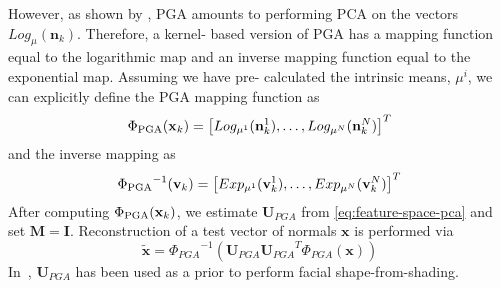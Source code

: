 However, as shown by \citet{smith2008facial}, PGA amounts to
performing PCA on the vectors $Log_\mu(\mathbf{n}_k)$. Therefore, a kernel-
based version of PGA has a mapping function equal to the logarithmic map and an
inverse mapping function equal to the exponential map. Assuming we have pre-
calculated the intrinsic means, $\mu^i$, we can explicitly define the PGA
mapping function as
\begin{equation}\label{eq:pga-kernel}
    \Phi_{\operatorname{PGA}} (\boldsymbol{\mathbf{x}}_k) = \left[ Log_{\mu^1}(\mathbf{n}_k^1), \ldots, Log_{\mu^N}(\mathbf{n}_k^N) \right]^T
\end{equation}
and the inverse mapping as 
\begin{equation}\label{eq:inv-pga-kernel}
    {\Phi_{\operatorname{PGA}}}^{-1} (\boldsymbol{\mathbf{v}}_k) = \left[ Exp_{\mu^1}(\mathbf{v}_k^1), \ldots, Exp_{\mu^N}(\mathbf{v}_k^N) \right]^T
\end{equation}
After computing $\Phi_{\operatorname{PGA}} (\boldsymbol{\mathbf{x}}_k)$, we estimate $\mathbf{U}_{PGA}$ from 
\cref{eq:feature-space-pca} and set $\mathbf{M} = \mathbf{I}$. Reconstruction 
of a test vector of normals $\mathbf{x}$ is performed via
\begin{equation}\label{eq:pga-reconstruction}
   \tilde{\mathbf{x}} = {\Phi_{PGA}}^{-1} \left( \mathbf{U}_{PGA} {\mathbf{U}_{PGA}}^T \Phi_{PGA}(\mathbf{x}) \right)
\end{equation}
In~\cite{smith2008facial}, $\mathbf{U}_{PGA}$ has been used as a prior to
perform facial shape-from-shading.
